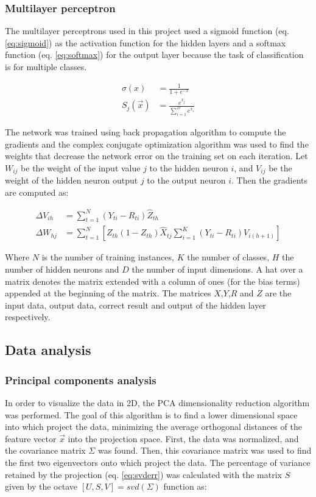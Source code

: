 \documentclass{IEEEtran}
\begin{document}
\subsubsection{Multilayer perceptron}
The multilayer perceptrons used in this project used a sigmoid function (eq. \ref{eq:sigmoid}) as the
activation function for the hidden layers and a softmax function (eq. \ref{eq:softmax}) for the output layer
because the task of classification is for multiple classes.

\begin{align}
\sigma(x) &= \frac{1}{1+e^{-x}} \label{eq:sigmoid} \\ 
S_j(\vec{x}) &= \frac{e^{x_j}}{\sum_{i=1}^D{e^{x_i}}} \label{eq:softmax}
\end{align}

The network was trained using back propagation algorithm to compute the gradients and the complex conjugate
optimization algorithm was used to find the weights that decrease the network error on the training set on
each iteration. Let $W_{ij}$ be the weight of the input value $j$ to the hidden neuron $i$, and $V_{ij}$ be
the weight of the hidden neuron output $j$ to the output neuron $i$. Then the gradients are computed as:

\begin{align}
\Delta V_{ih} &= \sum_{t=1}^{N}{(Y_{ti} - R_{ti}) \hat{Z}_{th}} \label{eq:gradV} \\ 
\Delta W_{hj} &= \sum_{t=1}^{N}{ 
    \left[ Z_{th}(1 - Z_{th})\hat{X}_{tj} \sum_{i=1}^{K}{ (Y_{ti} - R_{ti})V_{i(h+1)} } \right]
}  \label{eq:gradW}
\end{align}

Where $N$ is the number of training instances, $K$ the number of classes, $H$ the number of hidden neurons 
and $D$ the number of input dimensions. A hat over a matrix denotes the matrix extended with a column of
ones (for the bias terms) appended at the beginning of the matrix. The matrices $X$,$Y$,$R$ and $Z$ are
the input data, output data, correct result and output of the hidden layer respectively.

\subsection{Data analysis}

\subsubsection{Principal components analysis}
In order to visualize the data in 2D, the PCA dimensionality reduction algorithm was performed.
The goal of this algorithm is to find a lower dimensional space into which project the data, minimizing
the average orthogonal distances of the feature vector $\vec{x}$ into the projection space. First, the data
was normalized, and the covariance matrix $\Sigma$ was found. Then, this covariance matrix was used to find the
first two eigenvectors onto which project the data. The percentage of variance retained by the projection 
(eq. \ref{eq:svderr}) was calculated with the matrix $S$ given by the octave $[U,S,V] = svd(\Sigma)$ function as:
\end{document}
